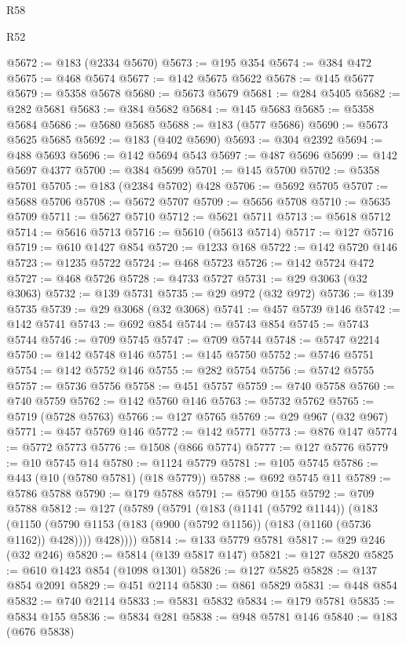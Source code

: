 \begin{lexlean}{R58}
\begin{lexlean}{R52}
\begin{coremodule}
{{{{{{{{{{{{{{{{{{{{{{{{{{{{{{{{{{{{{{{{{{{{{{{{{{{{{{{{{{{{{{{{{{{{{{{{{{{{{{{{{{{{{{{{{{{{{{{{{{{{{{{{{{{{{{{{{{{{{{{{{{{{{{{{{{{{{{{{{{{{{{{{{{{{{{{{{{{{{{{{{{{{{{{{{{{{{{{{{{{{{{{{{{{{{{{{{{{{{{@5672 := @183 (@2334 @5670)
@5673 := @195 @354
@5674 := @384 @472
@5675 := @468 @5674
@5677 := @142 @5675 @5622
@5678 := @145 @5677
@5679 := @5358 @5678
@5680 := @5673 @5679
@5681 := @284 @5405
@5682 := @282 @5681
@5683 := @384 @5682
@5684 := @145 @5683
@5685 := @5358 @5684
@5686 := @5680 @5685
@5688 := @183 (@577 @5686)
@5690 := @5673 @5625 @5685
@5692 := @183 (@402 @5690)
@5693 := @304 @2392
@5694 := @488 @5693
@5696 := @142 @5694 @543
@5697 := @487 @5696
@5699 := @142 @5697 @4377
@5700 := @384 @5699
@5701 := @145 @5700
@5702 := @5358 @5701
@5705 := @183 (@2384 @5702) @428
@5706 := @5692 @5705
@5707 := @5688 @5706
@5708 := @5672 @5707
@5709 := @5656 @5708
@5710 := @5635 @5709
@5711 := @5627 @5710
@5712 := @5621 @5711
@5713 := @5618 @5712
@5714 := @5616 @5713
@5716 := @5610 (@5613 @5714)
@5717 := @127 @5716
@5719 := @610 @1427 @854
@5720 := @1233 @168
@5722 := @142 @5720 @146
@5723 := @1235 @5722
@5724 := @468 @5723
@5726 := @142 @5724 @472
@5727 := @468 @5726
@5728 := @4733 @5727
@5731 := @29 @3063 (@32 @3063)
@5732 := @139 @5731
@5735 := @29 @972 (@32 @972)
@5736 := @139 @5735
@5739 := @29 @3068 (@32 @3068)
@5741 := @457 @5739 @146
@5742 := @142 @5741
@5743 := @692 @854
@5744 := @5743 @854
@5745 := @5743 @5744
@5746 := @709 @5745
@5747 := @709 @5744
@5748 := @5747 @2214
@5750 := @142 @5748 @146
@5751 := @145 @5750
@5752 := @5746 @5751
@5754 := @142 @5752 @146
@5755 := @282 @5754
@5756 := @5742 @5755
@5757 := @5736 @5756
@5758 := @451 @5757
@5759 := @740 @5758
@5760 := @740 @5759
@5762 := @142 @5760 @146
@5763 := @5732 @5762
@5765 := @5719 (@5728 @5763)
@5766 := @127 @5765
@5769 := @29 @967 (@32 @967)
@5771 := @457 @5769 @146
@5772 := @142 @5771
@5773 := @876 @147
@5774 := @5772 @5773
@5776 := @1508 (@866 @5774)
@5777 := @127 @5776
@5779 := @10 @5745 @14
@5780 := @1124 @5779
@5781 := @105 @5745
@5786 := @443 (@10 (@5780 @5781) (@18 @5779))
@5788 := @692 @5745 @11
@5789 := @5786 @5788
@5790 := @179 @5788
@5791 := @5790 @155
@5792 := @709 @5788
@5812 := @127
    (@5789
      (@5791
        (@183
          (@1141 (@5792 @1144))
          (@183
            (@1150 (@5790 @1153 (@183 (@900 (@5792 @1156)) (@183 (@1160 (@5736 @1162)) @428))))
            @428))))
@5814 := @133 @5779 @5781
@5817 := @29 @246 (@32 @246)
@5820 := @5814 (@139 @5817 @147)
@5821 := @127 @5820
@5825 := @610 @1423 @854 (@1098 @1301)
@5826 := @127 @5825
@5828 := @137 @854 @2091
@5829 := @451 @2114
@5830 := @861 @5829
@5831 := @448 @854
@5832 := @740 @2114
@5833 := @5831 @5832
@5834 := @179 @5781
@5835 := @5834 @155
@5836 := @5834 @281
@5838 := @948 @5781 @146
@5840 := @183 (@676 @5838)
}}}}}}}}}}}}}}}}}}}}}}}}}}}}}}}}}}}}}}}}}}}}}}}}}}}}}}}}}}}}}}}}}}}}}}}}}}}}}}}}}}}}}}}}}}}}}}}}}}}}}}}}}}}}}}}}}}}}}}}}}}}}}}}}}}}}}}}}}}}}}}}}}}}}}}}}}}}}}}}}}}}}}}}}}}}}}}}}}}}}}}}}}}}}}}}}}}}}}}
\end{coremodule}
\end{lexlean}
\end{lexlean}
